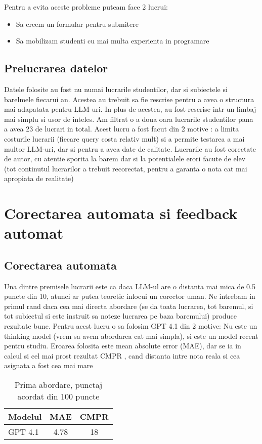 \documentclass[12pt, a4paper]{report}
\begin{document}
Pentru a evita aceste probleme puteam face 2 lucrui:
\begin{itemize}
  \item Sa creem un formular pentru submitere 
  \item Sa mobilizam studenti cu mai multa experienta in programare
\end{itemize}

\section{Prelucrarea datelor}
Datele folosite au fost nu numai lucrarile studentilor, dar si subiectele si barelmele fiecarui an. Acestea au trebuit sa fie rescrise pentru a avea o structura mai adapatata pentru LLM-uri.
In plus de acestea, au fost rescrise intr-un limbaj mai simplu si usor de inteles. Am filtrat o a doua oara lucrarile studentilor pana a avea 23 de lucrari in total. Acest lucru a fost facut din 2 motive : a limita costurile lucrarii (fiecare query costa relativ mult) si a permite 
testarea a mai multor LLM-uri, dar si pentru a avea date de calitate. 
Lucrarile au fost corectate de autor, cu atentie sporita la barem dar si la potentialele erori facute de elev (tot continutul lucrarilor a trebuit recorectat, pentru a garanta o nota cat mai apropiata de realitate)

\chapter{Corectarea automata si feedback automat}
\section{Corectarea automata}

Una dintre premisele lucrarii este ca daca LLM-ul are o distanta mai mica de 0.5 puncte din 10, atunci ar putea teoretic inlocui un corector uman.
Ne intrebam in primul rand daca cea mai directa abordare (se da toata lucrarea,
tot baremul, si tot subiectul si este instruit sa noteze lucrarea pe baza baremului) produce rezultate bune.
Pentru acest lucru o sa folosim GPT 4.1 din 2 motive: Nu este un thinking model (vrem sa avem abordarea cat mai simpla), si este un model recent pentru studiu.
Eroarea folosita este mean absolute error (MAE), dar se ia in calcul si cel mai prost rezultat CMPR , cand distanta intre nota reala si cea asignata a fost cea mai mare

\begin{table}[h!]
\centering
\begin{tabular}{|l|c|c|}
\hline
\textbf{Modelul} & \textbf{MAE} & \textbf{CMPR} \\
\hline
GPT 4.1 & 4.78 & 18\\
\hline
\end{tabular}
\caption{Prima abordare, punctaj acordat din 100 puncte}

\end{table}
\end{document}
